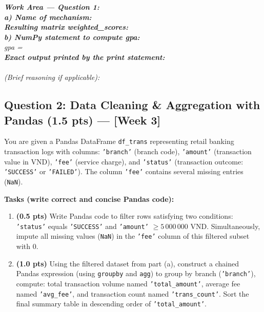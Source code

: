 \documentclass[11pt,a4paper]{article}
\newcommand{\answerbox}[2]{
  \vspace{1mm}
  \begin{tcolorbox}[
    colback=white,
    colframe=gray!60,
    boxrule=0.6pt,
    arc=2pt,
    height=#1,
    left=3mm, right=3mm, top=2mm, bottom=2mm
  ]
  \small\textit{\color{gray}#2}
  \end{tcolorbox}
  \vspace{1mm}
}
\begin{document}
\answerbox{12.0cm}{
\textbf{Work Area --- Question 1:}\\[3mm]
\textbf{a) Name of mechanism:} \dotfill\\[4mm]
\textbf{Resulting matrix weighted\_scores:}\\[28mm]
\textbf{b) NumPy statement to compute gpa:}\\
gpa = \dotfill\\[5mm]
\textbf{Exact output printed by the print statement:}\\
\dotfill\\[3mm]
\textit{(Brief reasoning if applicable):} \dotfill
}

\newpage
\subsection*{Question 2: Data Cleaning \& Aggregation with Pandas (1.5 pts) --- [Week 3]}
You are given a Pandas DataFrame \texttt{df\_trans} representing retail banking transaction logs with columns:
\texttt{'branch'} (branch code), \texttt{'amount'} (transaction value in VND), \texttt{'fee'} (service charge), and \texttt{'status'} (transaction outcome: \texttt{'SUCCESS'} or \texttt{'FAILED'}). The column \texttt{'fee'} contains several missing entries (\texttt{NaN}).

\noindent
\textbf{Tasks (write correct and concise Pandas code):}
\begin{enumerate}[label=\textbf{\alph*)}]
  \item \textbf{(0.5 pts)} Write Pandas code to filter rows satisfying two conditions: \texttt{'status'} equals \texttt{'SUCCESS'} and \texttt{'amount'} $\ge 5\,000\,000$ VND. Simultaneously, impute all missing values (\texttt{NaN}) in the \texttt{'fee'} column of this filtered subset with $0$.
  \item \textbf{(1.0 pts)} Using the filtered dataset from part (a), construct a chained Pandas expression (using \texttt{groupby} and \texttt{agg}) to group by branch (\texttt{'branch'}), compute: total transaction volume named \texttt{'total\_amount'}, average fee named \texttt{'avg\_fee'}, and transaction count named \texttt{'trans\_count'}. Sort the final summary table in descending order of \texttt{'total\_amount'}.
\end{enumerate}
\end{document}
